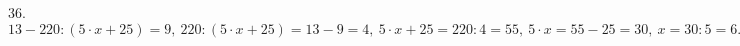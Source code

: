 36. $13-220:(5\cdot x+25)=9,\ 220:(5\cdot x+25)=13-9=4,\ 5\cdot x+25=220:4=55,\ 5\cdot x=55-25=30,\ x=30:5=6.$\\
